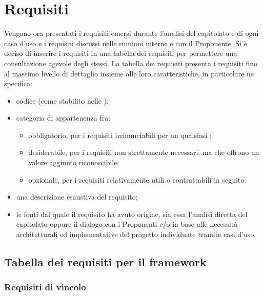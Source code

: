 \section{Requisiti}
Vengono ora presentati i requisiti emersi durante l'analisi del capitolato e di ogni caso d'uso e i requisiti discussi nelle riunioni interne e con il Proponente.
Si è deciso di inserire i requisiti in una tabella dei requisiti per permettere una consultazione agevole degli stessi.
La tabella dei requisiti presenta i requisiti fino al massimo livello di dettaglio insieme alle loro caratteristiche, in particolare ne specifica:
\begin{itemize}
	\item codice (come stabilito nelle \NormeDiProgetto{});
	\item categoria di appartenenza fra:
	\begin{itemize}
		\item obbligatorio, per i requisiti irrinunciabili per un qualsiasi ;
		\item desiderabile, per i requisiti non strettamente necessari, ma che offrono un valore aggiunto riconoscibile;
		\item opzionale, per i requisiti relativamente utili o contrattabili in seguito.
	\end{itemize}
	\item una descrizione esaustiva del requisito;
	\item le fonti dal quale il requisito ha avuto origine, sia essa l'analisi diretta del capitolato oppure il dialogo con i Proponenti e/o in base alle necessità architetturali ed implementative del progetto individuate tramite casi d'uso.	
\end{itemize}

\subsection{Tabella dei requisiti per il framework \ProjectName}

\subsubsection{Requisiti di vincolo}

